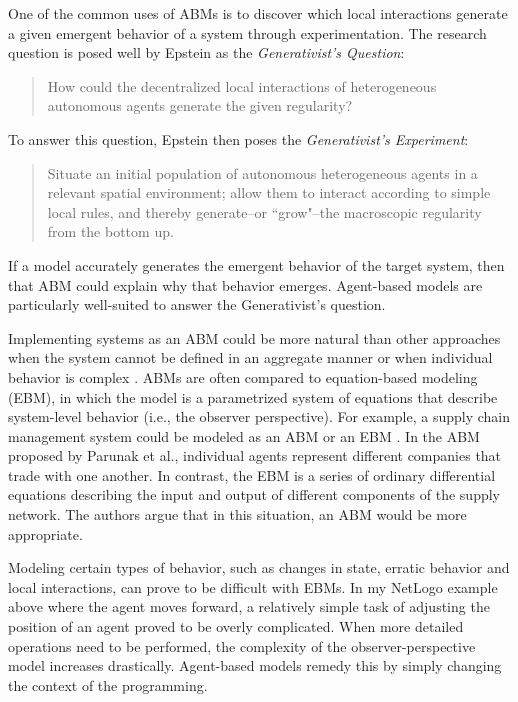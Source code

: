 One of the common uses of ABMs is to discover which local interactions generate a given emergent behavior of a system through experimentation.
The research question is posed well by Epstein as the \textit{Generativist's Question}:
\begin{quote}
   How could the decentralized local interactions of heterogeneous autonomous agents generate the given regularity?
\end{quote}
To answer this question, Epstein then poses the \textit{Generativist's Experiment}:
\begin{quote}
Situate an initial population of autonomous heterogeneous agents in a relevant spatial environment; allow them to interact according to simple local rules, and thereby generate--or ``grow"--the macroscopic regularity from the bottom up. \cite{epstein1999agent}
\end{quote}
If a model accurately generates the emergent behavior of the target system, then that ABM could explain why that behavior emerges.
Agent-based models are particularly well-suited to answer the Generativist's question.



Implementing systems as an ABM could be more natural than other approaches when the system cannot be defined in an aggregate manner or when individual behavior is complex \cite{bonabeau2002agent}.
ABMs are often compared to equation-based modeling (EBM), in which the model is a parametrized system of equations that describe system-level behavior (i.e., the observer perspective).
For example, a supply chain management system could be modeled as an ABM or an EBM \cite{parunak1998agent}.
In the ABM proposed by Parunak et al., individual agents represent different companies that trade with one another.
In contrast, the EBM is a series of ordinary differential equations describing the input and output of different components of the supply network.
The authors argue that in this situation, an ABM would be more appropriate.

Modeling certain types of behavior, such as changes in state, erratic behavior and local interactions, can prove to be difficult with EBMs.
In my NetLogo example above where the agent moves forward, a relatively simple task of adjusting the position of an agent proved to be overly complicated.
When more detailed operations need to be performed, the complexity of the observer-perspective model increases drastically.
Agent-based models remedy this by simply changing the context of the programming.


